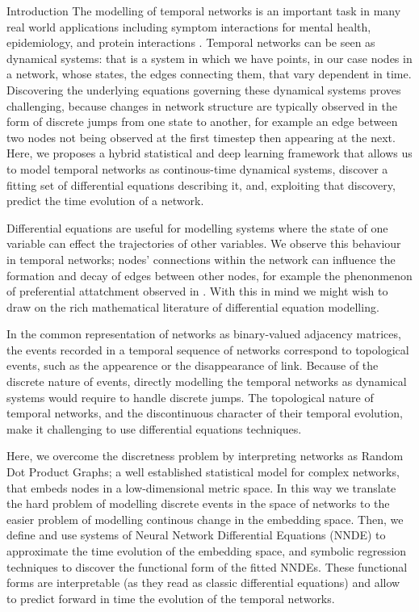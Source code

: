 \documentclass{article}
\begin{document}
\begin{section}{Introduction}
The modelling of temporal networks is an important task in many real world applications including symptom interactions for mental health, epidemiology, and protein interactions \cite{jordan2020current,contreras2020temporal,lucas2021inferring,jin2009identifying,masuda2013predicting}.
Temporal networks can be seen as dynamical systems: that is a system in which we have points, in our case nodes in a network, whose states, the edges connecting them, that vary dependent in time.
Discovering the underlying equations governing these dynamical systems proves challenging, because changes in network structure are typically observed in the form of discrete jumps from one state to another, for example an edge between two nodes not being observed at the first timestep then appearing at the next.
Here, we proposes a hybrid statistical and deep learning framework that allows us to model temporal networks as continous-time dynamical systems, discover a fitting set of differential equations describing it, and, exploiting that discovery, predict the time evolution of a network.

Differential equations are useful for modelling systems where the state of one variable can effect the trajectories of other variables. We observe this behaviour in temporal networks; nodes' connections within the network can influence the formation and decay of edges between other nodes, for example the phenonmenon of preferential attatchment observed in \cite{newman2001clustering,capocci2006preferential}. With this in mind we might wish to draw on the rich mathematical literature of differential equation modelling.

In the common representation of networks as binary-valued adjacency matrices, the events recorded in a temporal sequence of networks correspond to topological events, such as the appearence or the disappearance of link.
Because of the discrete nature of events, directly modelling the temporal networks as dynamical systems would require to handle discrete jumps.
The topological nature of temporal networks, and the discontinuous character of their temporal evolution, make it challenging to use differential equations techniques.

Here, we overcome the discretness problem by interpreting networks as Random Dot Product Graphs; a well established statistical model for complex networks, that embeds nodes in a low-dimensional metric space\cite{athreya2017statistical}. In this way we translate the hard problem of modelling discrete events in the space of networks to the easier problem of modelling continous change in the embedding space. Then, we define and use systems of Neural Network Differential Equations (NNDE) to approximate the time evolution of the embedding space, and symbolic regression techniques to discover the functional form of the fitted NNDEs. These functional forms are interpretable (as they read as classic differential equations) and allow to predict forward in time the evolution of the temporal networks.


\end{section}
\end{document}
